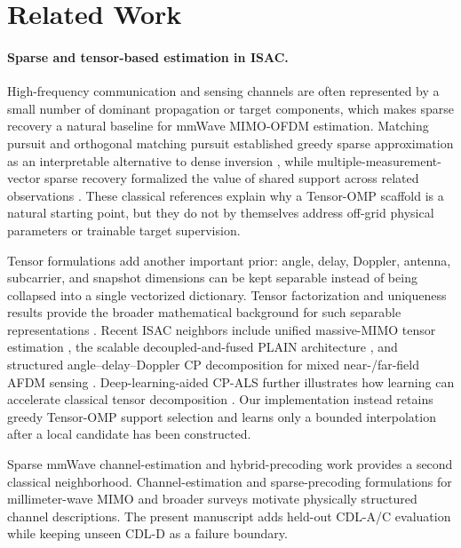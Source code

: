 \section{Related Work}

\paragraph{Sparse and tensor-based estimation in ISAC.}
High-frequency communication and sensing channels are often represented by a small number of dominant propagation or target components, which makes sparse recovery a natural baseline for mmWave MIMO-OFDM estimation. Matching pursuit and orthogonal matching pursuit established greedy sparse approximation as an interpretable alternative to dense inversion \cite{mallat1993matching,pati1993omp,tropp2007omp}, while multiple-measurement-vector sparse recovery formalized the value of shared support across related observations \cite{cotter2005mmv}. These classical references explain why a Tensor-OMP scaffold is a natural starting point, but they do not by themselves address off-grid physical parameters or trainable target supervision.

Tensor formulations add another important prior: angle, delay, Doppler, antenna, subcarrier, and snapshot dimensions can be kept separable instead of being collapsed into a single vectorized dictionary. Tensor factorization and uniqueness results provide the broader mathematical background for such separable representations \cite{sidiropoulos2000parallel,sidiropoulos2000unique,kolda2009tensor}. Recent ISAC neighbors include unified massive-MIMO tensor estimation \cite{zhang2024unified_tensor_isac}, the scalable decoupled-and-fused PLAIN architecture \cite{tahir2025plain}, and structured angle--delay--Doppler CP decomposition for mixed near-/far-field AFDM sensing \cite{luo2025angle_delay_doppler_afdm}. Deep-learning-aided CP-ALS further illustrates how learning can accelerate classical tensor decomposition \cite{gong2024dl_cpals}. Our implementation instead retains greedy Tensor-OMP support selection and learns only a bounded interpolation after a local candidate has been constructed.

Sparse mmWave channel-estimation and hybrid-precoding work provides a second classical neighborhood. Channel-estimation and sparse-precoding formulations for millimeter-wave MIMO \cite{alkhateeb2014channel,ayach2014spatially} and broader surveys \cite{heath2016overview,rangan2014mmwave} motivate physically structured channel descriptions. The present manuscript adds held-out CDL-A/C evaluation while keeping unseen CDL-D as a failure boundary.

